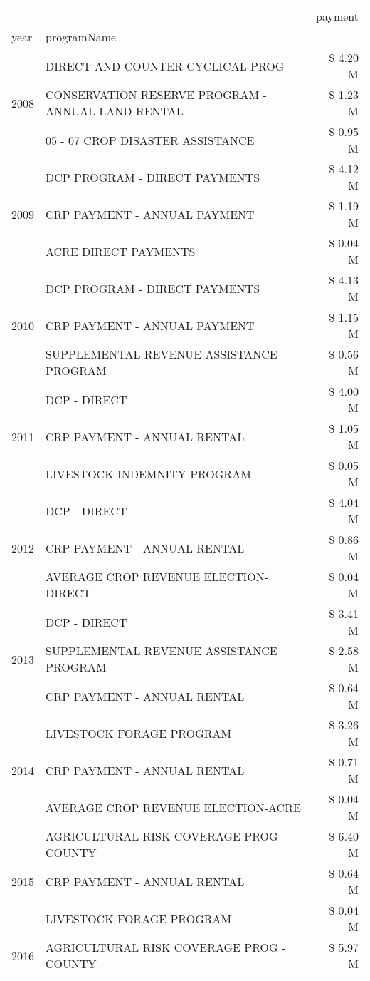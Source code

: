 \begin{tabular}{llr}
\toprule
 &  & payment \\
year & programName &  \\
\midrule
\multirow[t]{3}{*}{2008} & DIRECT AND COUNTER CYCLICAL PROG & \$ 4.20 M \\
 & CONSERVATION RESERVE PROGRAM - ANNUAL LAND RENTAL & \$ 1.23 M \\
 & 05 - 07 CROP DISASTER ASSISTANCE & \$ 0.95 M \\
\cline{1-3}
\multirow[t]{3}{*}{2009} & DCP PROGRAM - DIRECT PAYMENTS & \$ 4.12 M \\
 & CRP PAYMENT - ANNUAL PAYMENT & \$ 1.19 M \\
 & ACRE DIRECT PAYMENTS & \$ 0.04 M \\
\cline{1-3}
\multirow[t]{3}{*}{2010} & DCP PROGRAM - DIRECT PAYMENTS & \$ 4.13 M \\
 & CRP PAYMENT - ANNUAL PAYMENT & \$ 1.15 M \\
 & SUPPLEMENTAL REVENUE ASSISTANCE PROGRAM & \$ 0.56 M \\
\cline{1-3}
\multirow[t]{3}{*}{2011} & DCP - DIRECT & \$ 4.00 M \\
 & CRP PAYMENT - ANNUAL RENTAL & \$ 1.05 M \\
 & LIVESTOCK INDEMNITY PROGRAM & \$ 0.05 M \\
\cline{1-3}
\multirow[t]{3}{*}{2012} & DCP - DIRECT & \$ 4.04 M \\
 & CRP PAYMENT - ANNUAL RENTAL & \$ 0.86 M \\
 & AVERAGE CROP REVENUE ELECTION-DIRECT & \$ 0.04 M \\
\cline{1-3}
\multirow[t]{3}{*}{2013} & DCP - DIRECT & \$ 3.41 M \\
 & SUPPLEMENTAL REVENUE ASSISTANCE PROGRAM & \$ 2.58 M \\
 & CRP PAYMENT - ANNUAL RENTAL & \$ 0.64 M \\
\cline{1-3}
\multirow[t]{3}{*}{2014} & LIVESTOCK FORAGE PROGRAM & \$ 3.26 M \\
 & CRP PAYMENT - ANNUAL RENTAL & \$ 0.71 M \\
 & AVERAGE CROP REVENUE ELECTION-ACRE & \$ 0.04 M \\
\cline{1-3}
\multirow[t]{3}{*}{2015} & AGRICULTURAL RISK COVERAGE PROG - COUNTY & \$ 6.40 M \\
 & CRP PAYMENT - ANNUAL RENTAL & \$ 0.64 M \\
 & LIVESTOCK FORAGE PROGRAM & \$ 0.04 M \\
\cline{1-3}
\multirow[t]{3}{*}{2016} & AGRICULTURAL RISK COVERAGE PROG - COUNTY & \$ 5.97 M \\

\end{tabular}
